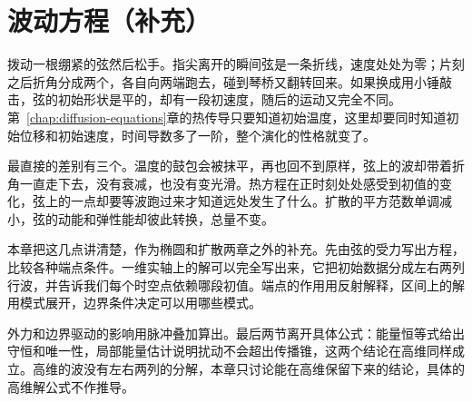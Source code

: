 \chapter{波动方程（补充）}
\label{chap:wave-equations}

拨动一根绷紧的弦然后松手。指尖离开的瞬间弦是一条折线，速度处处为零；片刻之后折角分成两个，各自向两端跑去，碰到琴桥又翻转回来。如果换成用小锤敲击，弦的初始形状是平的，却有一段初速度，随后的运动又完全不同。第~\ref{chap:diffusion-equations}章的热传导只要知道初始温度，这里却要同时知道初始位移和初始速度，时间导数多了一阶，整个演化的性格就变了。

最直接的差别有三个。温度的鼓包会被抹平，再也回不到原样，弦上的波却带着折角一直走下去，没有衰减，也没有变光滑。热方程在正时刻处处感受到初值的变化，弦上的一点却要等波跑过来才知道远处发生了什么。扩散的平方范数单调减小，弦的动能和弹性能却彼此转换，总量不变。

本章把这几点讲清楚，作为椭圆和扩散两章之外的补充。先由弦的受力写出方程，比较各种端点条件。一维实轴上的解可以完全写出来，它把初始数据分成左右两列行波，并告诉我们每个时空点依赖哪段初值。端点的作用用反射解释，区间上的解用模式展开，边界条件决定可以用哪些模式。

外力和边界驱动的影响用脉冲叠加算出。最后两节离开具体公式：能量恒等式给出守恒和唯一性，局部能量估计说明扰动不会超出传播锥，这两个结论在高维同样成立。高维的波没有左右两列的分解，本章只讨论能在高维保留下来的结论，具体的高维解公式不作推导。















